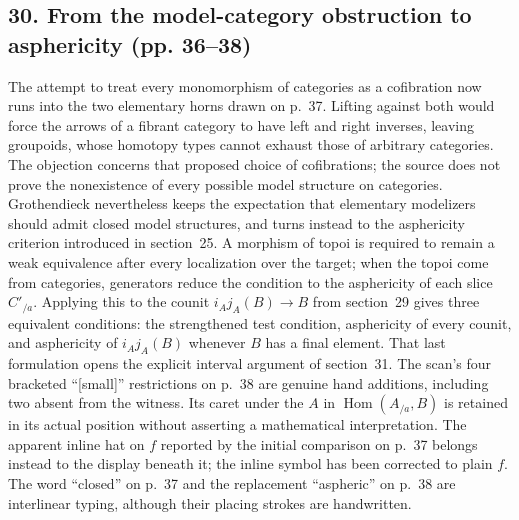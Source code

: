 \documentclass[10pt,oneside]{book}
\begin{document}
\subsection*{30. From the model-category obstruction to asphericity (pp. 36--38)}
The attempt to treat every monomorphism of categories as a cofibration now runs into the two elementary horns drawn on p.~37. Lifting against both would force the arrows of a fibrant category to have left and right inverses, leaving groupoids, whose homotopy types cannot exhaust those of arbitrary categories. The objection concerns that proposed choice of cofibrations; the source does not prove the nonexistence of every possible model structure on categories. Grothendieck nevertheless keeps the expectation that elementary modelizers should admit closed model structures, and turns instead to the asphericity criterion introduced in section~25. A morphism of topoi is required to remain a weak equivalence after every localization over the target; when the topoi come from categories, generators reduce the condition to the asphericity of each slice $C'_{/a}$. Applying this to the counit $i_Aj_A(B)\to B$ from section~29 gives three equivalent conditions: the strengthened test condition, asphericity of every counit, and asphericity of $i_Aj_A(B)$ whenever $B$ has a final element. That last formulation opens the explicit interval argument of section~31. The scan's four bracketed ``[small]'' restrictions on p.~38 are genuine hand additions, including two absent from the witness. Its caret under the $A$ in $\operatorname{Hom}(A_{/a},B)$ is retained in its actual position without asserting a mathematical interpretation. The apparent inline hat on $f$ reported by the initial comparison on p.~37 belongs instead to the display beneath it; the inline symbol has been corrected to plain $f$. The word ``closed'' on p.~37 and the replacement ``aspheric'' on p.~38 are interlinear typing, although their placing strokes are handwritten.
\end{document}
